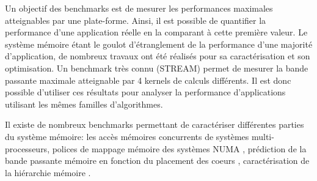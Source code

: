     Un objectif des benchmarks est de mesurer les performances maximales atteignables par une plate-forme. Ainsi, il est possible de quantifier la performance d'une application réelle en la comparant à cette première valeur. Le système mémoire étant le goulot d'étranglement de la performance d'une majorité d'application, de nombreux travaux ont été réalisés pour sa caractérisation et son optimisation. Un benchmark très connu (STREAM) permet de mesurer la bande passante maximale atteignable par 4 kernels de calculs différents. Il est donc possible d'utiliser ces résultats pour analyser la performance d'applications utilisant les mêmes familles d'algorithmes.


   Il existe de nombreux benchmarks permettant de caractériser différentes parties du système mémoire: les accès mémoires concurrents de systèmes multi-processeurs\cite{Mandal2010}, polices de mappage mémoire des systèmes NUMA \cite{Diener2015}, prédiction de la bande passante mémoire en fonction du placement des coeurs \cite{Wang2016a}, caractérisation de la hiérarchie mémoire \cite{Cooper2011}.
    
  